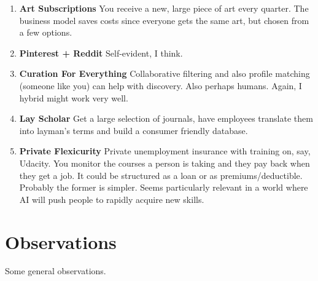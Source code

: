 \documentclass[paper=a4, fontsize=11pt]{scrartcl} %
\numberwithin{equation}{section} %
\numberwithin{figure}{section} %
\numberwithin{table}{section} %
\begin{document}
\begin{enumerate}
\item \textbf{Art Subscriptions} You receive a new, large piece of art every quarter.  The business model saves costs since everyone gets the same art, but chosen from a few options. 

\item \textbf{Pinterest + Reddit} Self-evident, I think.

\item \textbf{Curation For Everything} Collaborative filtering and also profile matching (someone like you) can help with discovery.  Also perhaps humans.  Again, I hybrid might work very well.  

\item \textbf{Lay Scholar} Get a large selection of journals, have employees translate them into layman's terms and build a consumer friendly database.  

\item \textbf{Private Flexicurity} Private unemployment insurance with training on, say, Udacity.  You monitor the courses a person is taking and they pay back when they get a job.  It could be structured as a loan or as premiums/deductible.  Probably the former is simpler.  Seems particularly relevant in a world where AI will push people to rapidly acquire new skills.

\end{enumerate}




\section{Observations}

Some general observations.
 
\end{document}
